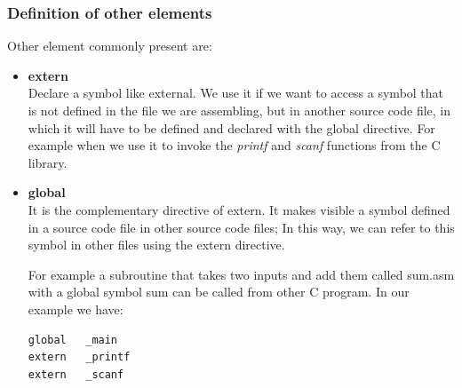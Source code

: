 \subsubsection{Definition of other elements}
Other element commonly present are:
\begin{itemize}
\item \textbf{extern} \\
Declare a symbol like external. We use it if we want to access a symbol that is not defined in the file we are assembling, but in another source code file, in which it will have to be defined and declared with the global directive. For example when we use it to invoke the \textit{printf} and \textit{scanf} functions from the C library.

\item \textbf{global}\\
It is the complementary directive of extern. It makes visible a symbol defined in a source code file in other source code files; In this way, we can refer to this symbol in other files using the extern directive.

For example a subroutine that takes two inputs and add them called sum.asm with a global symbol \textunderscore sum can be called from other C program. In our example we have:
\begin{verbatim}
global	 _main
extern	 _printf
extern	 _scanf
\end{verbatim}
\end{itemize}

